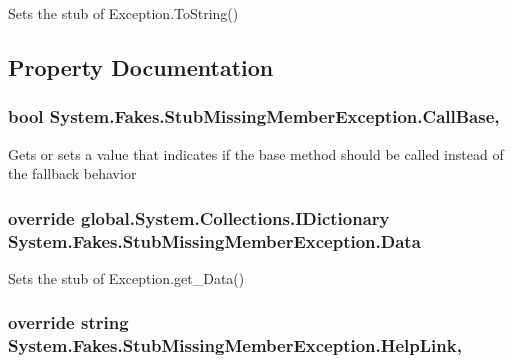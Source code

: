 Sets the stub of Exception.\-To\-String()



\subsection{Property Documentation}
\hypertarget{class_system_1_1_fakes_1_1_stub_missing_member_exception_a196e583400b37a104b62e3177e32447f}{
\subsubsection[{Call\-Base}]{\setlength{\rightskip}{0pt plus 5cm}bool System.\-Fakes.\-Stub\-Missing\-Member\-Exception.\-Call\-Base\hspace{0.3cm}{\ttfamily [get]}, {\ttfamily [set]}}}\label{class_system_1_1_fakes_1_1_stub_missing_member_exception_a196e583400b37a104b62e3177e32447f}


Gets or sets a value that indicates if the base method should be called instead of the fallback behavior

\hypertarget{class_system_1_1_fakes_1_1_stub_missing_member_exception_aaa99935ddde2a66d4fa5bb825005592a}{
\subsubsection[{Data}]{\setlength{\rightskip}{0pt plus 5cm}override global.\-System.\-Collections.\-I\-Dictionary System.\-Fakes.\-Stub\-Missing\-Member\-Exception.\-Data\hspace{0.3cm}{\ttfamily [get]}}}\label{class_system_1_1_fakes_1_1_stub_missing_member_exception_aaa99935ddde2a66d4fa5bb825005592a}


Sets the stub of Exception.\-get\-\_\-\-Data()

\hypertarget{class_system_1_1_fakes_1_1_stub_missing_member_exception_a4cf9150a58dad34cb1cdce51372b41ce}{
\subsubsection[{Help\-Link}]{\setlength{\rightskip}{0pt plus 5cm}override string System.\-Fakes.\-Stub\-Missing\-Member\-Exception.\-Help\-Link\hspace{0.3cm}{\ttfamily [get]}, {\ttfamily [set]}}}\label{class_system_1_1_fakes_1_1_stub_missing_member_exception_a4cf9150a58dad34cb1cdce51372b41ce}


